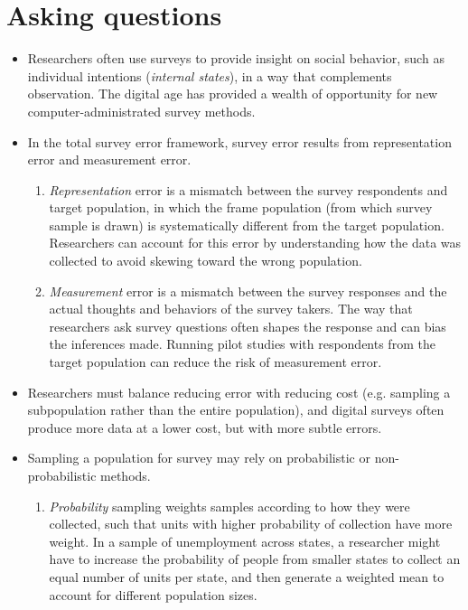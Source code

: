 \documentclass[11pt,letterpaper]{article}
\begin{document}
\section{Asking questions}
\begin{itemize}
\item Researchers often use surveys to provide insight on social behavior, such as individual intentions (\emph{internal states}), in a way that complements observation. The digital age has provided a wealth of opportunity for new computer-administrated survey methods.
\item In the total survey error framework, survey error results from representation error and measurement error.
\begin{enumerate}
\item \emph{Representation} error is a mismatch between the survey respondents and target population, in which the frame population (from which survey sample is drawn) is systematically different from the target population. Researchers can account for this error by understanding how the data was collected to avoid skewing toward the wrong population.
\item \emph{Measurement} error is a mismatch between the survey responses and the actual thoughts and behaviors of the survey takers. The way that researchers ask survey questions often shapes the response and can bias the inferences made. Running pilot studies with respondents from the target population can reduce the risk of measurement error.
\end{enumerate}
\item Researchers must balance reducing error with reducing cost (e.g. sampling a subpopulation rather than the entire population), and digital surveys often produce more data at a lower cost, but with more subtle errors.
\item Sampling a population for survey may rely on probabilistic or non-probabilistic methods.
\begin{enumerate}
\item \emph{Probability} sampling weights samples according to how they were collected, such that units with higher probability of collection have more weight. In a sample of unemployment across states, a researcher might have to increase the probability of people from smaller states to collect an equal number of units per state, and then generate a weighted mean to account for different population sizes. 

\end{enumerate}
\end{itemize}
\end{document}
